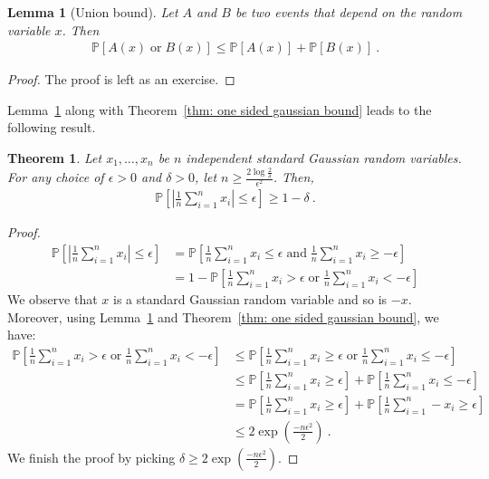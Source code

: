 \documentclass[11pt]{article}
\newtheorem{theorem}{Theorem}
\newtheorem{lemma}{Lemma}
\newcommand{\prob}[1]{\mathbb{P}\left[ #1 \right]}
\newcommand{\abs}[1]{\left| #1 \right|}
\begin{document}
\begin{lemma}[Union bound]
    \label{lem:union bound}
    Let $A$ and $B$ be two events that depend on the random variable $x$. Then
    \begin{align}
        \label{eq: union bound}
        \prob{A(x) \;\text{or}\; B(x) } \leq \prob{A(x)} + \prob{B(x)}~. 
    \end{align}
\end{lemma}
\begin{proof}
    The proof is left as an exercise.
\end{proof}
Lemma~\ref{lem:union bound} along with Theorem~\ref{thm: one sided gaussian bound} leads to the following result.
\begin{theorem}
    \label{thm: two sided gaussian bound}
    Let $x_1,\ldots,x_n$ be $n$ independent standard Gaussian random variables. For any choice of $\epsilon > 0$ and $\delta > 0$, let $n \geq \frac{2 \log \frac{2}{\delta}}{\epsilon^2}$. Then,
    \begin{align}
        \label{eq: two sided gaussian bound}
        \prob{\abs{\frac{1}{n} \sum_{i=1}^n x_i} \leq \epsilon} \geq 1 -  \delta~.
    \end{align}
\end{theorem}
\begin{proof}
    \begin{align}
        \prob{\abs{\frac{1}{n} \sum_{i=1}^n x_i} \leq \epsilon} &= \prob{ \frac{1}{n} \sum_{i=1}^n x_i \leq \epsilon \; \text{and}\; \frac{1}{n} \sum_{i=1}^n x_i \geq -\epsilon} \\
        &= 1 - \prob{ \frac{1}{n} \sum_{i=1}^n x_i > \epsilon \; \text{or}\; \frac{1}{n} \sum_{i=1}^n x_i < -\epsilon}
    \end{align}
    We observe that $x$ is a standard Gaussian random variable and so is $-x$. Moreover, using Lemma~\ref{lem:union bound} and Theorem~\ref{thm: one sided gaussian bound}, we have:
    \begin{align}
        \prob{ \frac{1}{n} \sum_{i=1}^n x_i > \epsilon \; \text{or}\; \frac{1}{n} \sum_{i=1}^n x_i < -\epsilon} &\leq \prob{ \frac{1}{n} \sum_{i=1}^n x_i \geq \epsilon \; \text{or}\; \frac{1}{n} \sum_{i=1}^n x_i \leq -\epsilon} \\
        &\leq \prob{ \frac{1}{n} \sum_{i=1}^n x_i \geq \epsilon}  + \prob{\frac{1}{n} \sum_{i=1}^n x_i \leq -\epsilon} \\
        &= \prob{ \frac{1}{n} \sum_{i=1}^n x_i \geq \epsilon}  + \prob{\frac{1}{n} \sum_{i=1}^n - x_i \geq \epsilon} \\
        &\leq 2 \exp\left(\frac{-n\epsilon^2}{2}\right)~.
    \end{align}
    We finish the proof by picking $\delta \geq 2 \exp\left(\frac{-n\epsilon^2}{2}\right)$.
\end{proof}
\end{document}
